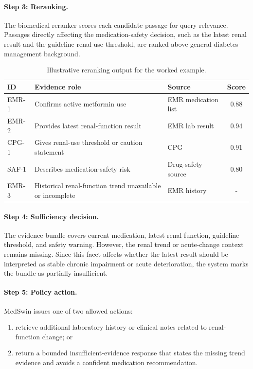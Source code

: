 \documentclass[conference]{IEEEtran}
\begin{document}
\paragraph{Step 3: Reranking.}
The biomedical reranker scores each candidate passage for query relevance. Passages directly affecting the medication-safety decision, such as the latest renal result and the guideline renal-use threshold, are ranked above general diabetes-management background.

\begin{table}[h!]
\centering
\caption{Illustrative reranking output for the worked example.}
\label{tab:appendix-worked-example-rerank}
\scriptsize
\begin{tabularx}{\linewidth}{l X l c}
\toprule
\textbf{ID} & \textbf{Evidence role} & \textbf{Source} & \textbf{Score} \\
\midrule
EMR-1 & Confirms active metformin use & EMR medication list & 0.88 \\
EMR-2 & Provides latest renal-function result & EMR lab result & 0.94 \\
CPG-1 & Gives renal-use threshold or caution statement & CPG & 0.91 \\
SAF-1 & Describes medication-safety risk & Drug-safety source & 0.80 \\
EMR-3 & Historical renal-function trend unavailable or incomplete & EMR history & - \\
\bottomrule
\end{tabularx}
\end{table}

\paragraph{Step 4: Sufficiency decision.}
The evidence bundle covers current medication, latest renal function, guideline threshold, and safety warning. However, the renal trend or acute-change context remains missing. Since this facet affects whether the latest result should be interpreted as stable chronic impairment or acute deterioration, the system marks the bundle as partially insufficient.

\paragraph{Step 5: Policy action.}
MedSwin issues one of two allowed actions:
\begin{enumerate}
    \item retrieve additional laboratory history or clinical notes related to renal-function change; or
    \item return a bounded insufficient-evidence response that states the missing trend evidence and avoids a confident medication recommendation.
\end{enumerate}
\end{document}
